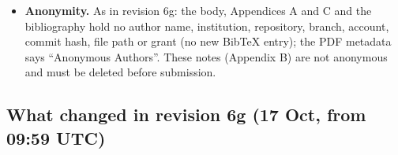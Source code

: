 \documentclass{article}
\theoremstyle{plain}
\theoremstyle{definition}
\theoremstyle{remark}
\begin{document}
\begin{itemize}
        (item 4) and \nolinkurl{short_last.py} (paragraph-final short lines,
        used to choose the trims). Each body change is a single-match
        replacement (whitespace-tolerant in the LaTeX), so the two files carry
        the same words.
  \item \textbf{Anonymity.} As in revision 6g: the body, Appendices A and C and
        the bibliography hold no author name, institution, repository, branch,
        account, commit hash, file path or grant (no new BibTeX entry); the PDF
        metadata says ``Anonymous Authors''. These notes (Appendix B) are not
        anonymous and must be deleted before submission.
\end{itemize}

\subsection{What changed in revision 6g (17 Oct, from 09:59 UTC)}
\end{document}
